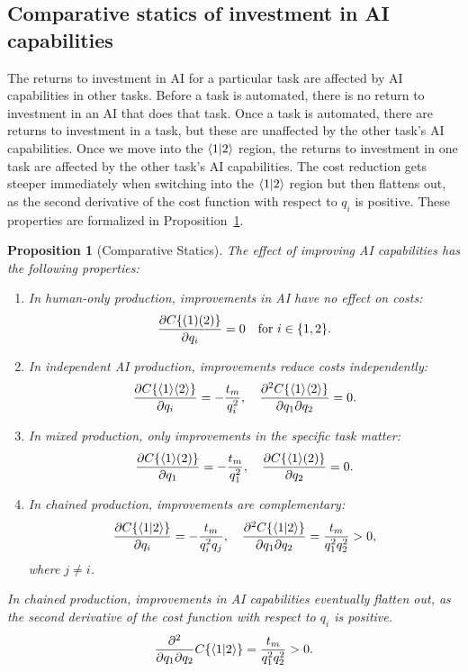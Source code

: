 \documentclass{article}
\theoremstyle{plain}
\theoremstyle{plain}
\newtheorem{proposition}[theorem]{Proposition}
\begin{document}
\subsection{Comparative statics of investment in AI capabilities}
The returns to investment in AI for a particular task are affected by AI capabilities in other tasks.
Before a task is automated, there is no return to investment in an AI that does that task.
Once a task is automated, there are returns to investment in a task, but these are unaffected by the other task's AI capabilities.
Once we move into the \(\langle 1|2 \rangle\) region, the returns to investment in one task are affected by the other task's AI capabilities.
The cost reduction gets steeper immediately when switching into the \(\langle 1|2 \rangle\) region but then flattens out, as the second derivative of the cost function with respect to \(q_i\) is positive.
These properties are formalized in Proposition~\ref{prop:comparative_statics}.

\begin{proposition}[Comparative Statics] \label{prop:comparative_statics}
  The effect of improving AI capabilities has the following properties:
  \begin{enumerate}
  \item In human-only production, improvements in AI have no effect on costs:
  \[
  \frac{\partial C\{ ( 1 )( 2 ) \}}{\partial q_i} = 0 \quad \text{for } i \in \{1,2\}.
  \]
  \item In independent AI production, improvements reduce costs independently:
  \[
  \frac{\partial C\{ \langle 1 \rangle\langle 2 \rangle \}}{\partial q_i} = -\frac{t_{m}}{q_i^2}, \quad \frac{\partial^2 C\{ \langle 1 \rangle\langle 2 \rangle \}}{\partial q_1 \partial q_2} = 0.
  \]
  \item In mixed production, only improvements in the specific task matter:
  \[
  \frac{\partial C\{ \langle 1 \rangle( 2 ) \}}{\partial q_1} = -\frac{t_{m}}{q_1^2}, \quad \frac{\partial C\{ \langle 1 \rangle( 2 ) \}}{\partial q_2} = 0.
  \]
  \item In chained production, improvements are complementary:
  \[
  \frac{\partial C\{ \langle 1|2 \rangle \}}{\partial q_i} = -\frac{t_{m}}{q_i^2 q_j}, \quad \frac{\partial^2 C\{ \langle 1|2 \rangle \}}{\partial q_1 \partial q_2} = \frac{t_{m}}{q_1^2 q_2^2} > 0,
  \]
  where \(j \neq i\).
  \end{enumerate}

  In chained production, improvements in AI capabilities eventually flatten out, as the second derivative of the cost function with respect to \(q_i\) is positive.
  \begin{equation}
      \frac{\partial^2}{\partial q_1 \partial q_2} C\{ \langle 1|2 \rangle \} = \frac{t_{m}}{q_1^2 q_2^2} > 0.
  \end{equation}

\end{proposition}
 
\end{document}
